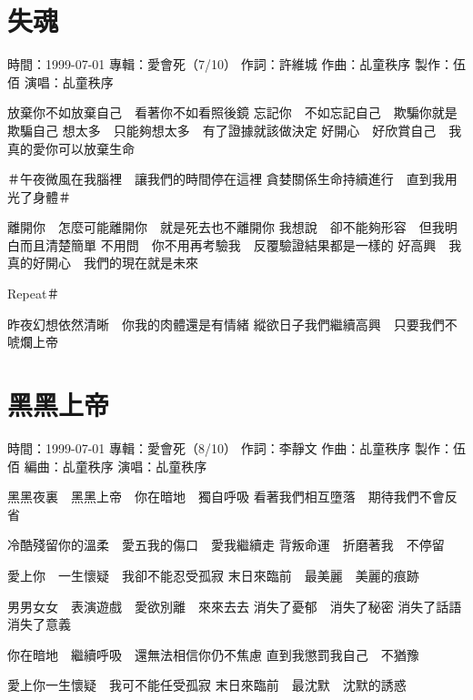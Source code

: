 \documentclass[UTF8,a4paper,oneside,twocolumn,12pt]{ctexbook}
\newcommand{\infopair}[2]{\textbullet #1：#2}
\newcommand{\zc}[1][伍佰]{\infopair{作詞}{#1}}
\newcommand{\zq}[1][伍佰]{\infopair{作曲}{#1}}
\newcommand{\bq}[1][伍佰]{\infopair{編曲}{#1}}
\newcommand{\zj}[1]{\infopair{專輯}{#1}}
\newcommand{\zz}[1]{\infopair{製作}{#1}}
\newcommand{\sj}[1]{\infopair{時間}{#1}}
\newenvironment{info}{\begin{flushleft}\kaishu
	}
	{\end{flushleft}\normalsize\yahei\par}
\newenvironment{lyric}{
	}
{}
\begin{document}
\section{失魂}
\begin{info}
	\sj{1999-07-01}
	\zj{愛會死（7/10）}
	\zc[許維城]
	\zq[乩童秩序]
	\zz{伍佰}
	\infopair{演唱}{乩童秩序}
\end{info}
\begin{lyric}
	放棄你不如放棄自己　看著你不如看照後鏡
	忘記你　不如忘記自己　欺騙你就是欺騙自己
	想太多　只能夠想太多　有了證據就該做決定
	好開心　好欣賞自己　我真的愛你可以放棄生命

	＃午夜微風在我腦裡　讓我們的時間停在這裡
	貪婪關係生命持續進行　直到我用光了身體＃

	離開你　怎麼可能離開你　就是死去也不離開你
	我想說　卻不能夠形容　但我明白而且清楚簡單
	不用問　你不用再考驗我　反覆驗證結果都是一樣的
	好高興　我真的好開心　我們的現在就是未來

	Repeat＃

	昨夜幻想依然清晰　你我的肉體還是有情緒
	縱欲日子我們繼續高興　只要我們不唬爛上帝
\end{lyric}

\section{黑黑上帝}
\begin{info}
	\sj{1999-07-01}
	\zj{愛會死（8/10）}
	\zc[李靜文]
	\zq[乩童秩序]
	\zz{伍佰}
	\bq[乩童秩序]
	\infopair{演唱}{乩童秩序}
\end{info}
\begin{lyric}
	黑黑夜裏　黑黑上帝　你在暗地　獨自呼吸
	看著我們相互墮落　期待我們不會反省

	冷酷殘留你的溫柔　愛五我的傷口　愛我繼續走
	背叛命運　折磨著我　不停留

	愛上你　一生懷疑　我卻不能忍受孤寂
	末日來臨前　最美麗　美麗的痕跡

	男男女女　表演遊戲　愛欲別離　來來去去
	消失了憂郁　消失了秘密
	消失了話語　消失了意義

	你在暗地　繼續呼吸　還無法相信你仍不焦慮
	直到我懲罰我自己　不猶豫

	愛上你一生懷疑　我可不能任受孤寂
	末日來臨前　最沈默　沈默的誘惑
\end{lyric}
\end{document}
